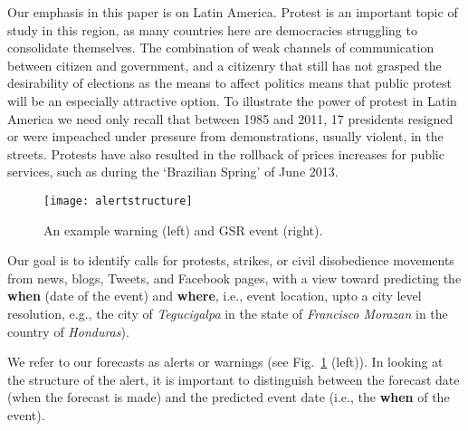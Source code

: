 Our emphasis in this paper is on Latin America.
Protest is an important topic of study in this
region, as many countries here are democracies struggling to consolidate themselves.
The combination of weak channels of communication between citizen and government, and a citizenry that still 
has not grasped the desirability of elections as the means to affect politics means that public protest 
will be an especially attractive option. To illustrate the power of protest in Latin America we need 
only recall that between 1985 and 2011, 17 presidents resigned or were impeached under pressure from 
demonstrations, usually violent, in the streets. Protests have also resulted 
in the rollback of prices increases for public services, such as during the `Brazilian Spring' of June 2013.
\begin{figure}
    \texttt{[image: alertstructure]}
    \vspace{-2em}
    \caption{An example warning (left) and GSR event (right).}
    \label{fig:alertstructure}
\end{figure}
Our goal is to identify calls for protests, strikes, or civil disobedience movements from news, blogs, Tweets, and Facebook
pages, with a view toward predicting the {\bf when} (date of the event) and {\bf where}, i.e.,
event location, upto a city level resolution, e.g., 
the city of {\it Tegucigalpa} in the state of {\it Francisco Morazan} in the country of {\it Honduras}).
\iffalse
In addition we seek to forecast the `why' and `who' of the protest.
The {\bf why} (or event type)
captures the main objective or reason for a civil unrest event,
and is meant to come from 7 broad classes (e.g., `Employment \& Wages',
`Housing', `Energy \& Resources' etc.) each of which is further categorized into
whether the event is forecast to be violent or not.
Finally, the {\bf who} (or population)
denotes common categories of human populations
used in event coding~\cite{philschrodt}
such as
Business, Ethnic, Legal (e.g. judges or lawyers), Education (e.g. teachers or students or parents of students), Religious (e.g. clergy), Medical (e.g., doctors or nurses), Media, Labor, Refugees/Displaced, Agricultural (e.g. farmers,
or just General Population. 
\fi
We refer to our forecasts as alerts or warnings (see Fig.~\ref{fig:alertstructure} (left)).
In looking at the structure of the alert, it is important to distinguish between the forecast date (when the forecast is made)
and the predicted event date (i.e., the {\bf when} of the event).

